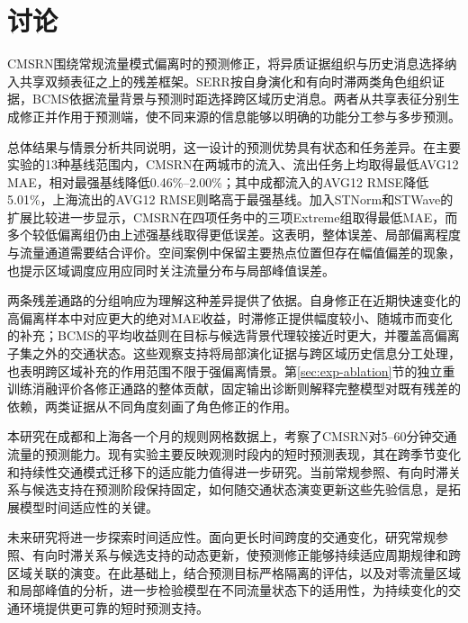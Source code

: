 
\section{讨论}\label{sec:discussion}

CMSRN围绕常规流量模式偏离时的预测修正，将异质证据组织与历史消息选择纳入共享双频表征之上的残差框架。SERR按自身演化和有向时滞两类角色组织证据，BCMS依据流量背景与预测时距选择跨区域历史消息。两者从共享表征分别生成修正并作用于预测端，使不同来源的信息能够以明确的功能分工参与多步预测。

总体结果与情景分析共同说明，这一设计的预测优势具有状态和任务差异。在主要实验的13种基线范围内，CMSRN在两城市的流入、流出任务上均取得最低AVG12 MAE，相对最强基线降低0.46\%--2.00\%；其中成都流入的AVG12 RMSE降低5.01\%，上海流出的AVG12 RMSE则略高于最强基线。加入STNorm和STWave的扩展比较进一步显示，CMSRN在四项任务中的三项Extreme组取得最低MAE，而多个较低偏离组仍由上述强基线取得更低误差。这表明，整体误差、局部偏离程度与流量通道需要结合评价。空间案例中保留主要热点位置但存在幅值偏差的现象，也提示区域调度应用应同时关注流量分布与局部峰值误差。

两条残差通路的分组响应为理解这种差异提供了依据。自身修正在近期快速变化的高偏离样本中对应更大的绝对MAE收益，时滞修正提供幅度较小、随城市而变化的补充；BCMS的平均收益则在目标与候选背景代理较接近时更大，并覆盖高偏离子集之外的交通状态。这些观察支持将局部演化证据与跨区域历史信息分工处理，也表明跨区域补充的作用范围不限于强偏离情景。第\ref{sec:exp-ablation}节的独立重训练消融评价各修正通路的整体贡献，固定输出诊断则解释完整模型对既有残差的依赖，两类证据从不同角度刻画了角色修正的作用。

本研究在成都和上海各一个月的规则网格数据上，考察了CMSRN对5–60分钟交通流量的预测能力。现有实验主要反映观测时段内的短时预测表现，其在跨季节变化和持续性交通模式迁移下的适应能力值得进一步研究。当前常规参照、有向时滞关系与候选支持在预测阶段保持固定，如何随交通状态演变更新这些先验信息，是拓展模型时间适应性的关键。

未来研究将进一步探索时间适应性。面向更长时间跨度的交通变化，研究常规参照、有向时滞关系与候选支持的动态更新，使预测修正能够持续适应周期规律和跨区域关联的演变。在此基础上，结合预测目标严格隔离的评估，以及对零流量区域和局部峰值的分析，进一步检验模型在不同流量状态下的适用性，为持续变化的交通环境提供更可靠的短时预测支持。
